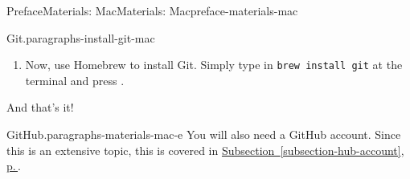 \documentclass[twoside,10pt,]{book}
\newcommand{\xreffont}{\relax}
\newcommand{\mono}[1]{\texttt{#1}}
\newcommand{\kbd}[1]{\keys{{#1}}}
\begin{document}
\begin{preface}{Preface}{Materials: Mac}{}{Materials: Mac}{}{}{preface-materials-mac}
\begin{paragraphs}{Git.}{paragraphs-install-git-mac}
\begin{enumerate}
\item{}Now, use Homebrew to install Git. Simply type in \mono{brew install git} at the terminal and press \kbd{Enter}.%
\end{enumerate}
And that's it!%
\end{paragraphs}%
\begin{paragraphs}{GitHub.}{paragraphs-materials-mac-e}%
You will also need a GitHub account. Since this is an extensive topic, this is covered in \hyperref[subsection-hub-account]{Subsection~{\xreffont\ref{subsection-hub-account}}, p.\,\pageref{subsection-hub-account}}.%
\end{paragraphs}%
\end{preface}
%
%
\typeout{************************************************}
\typeout{************************************************}
%
\end{document}

